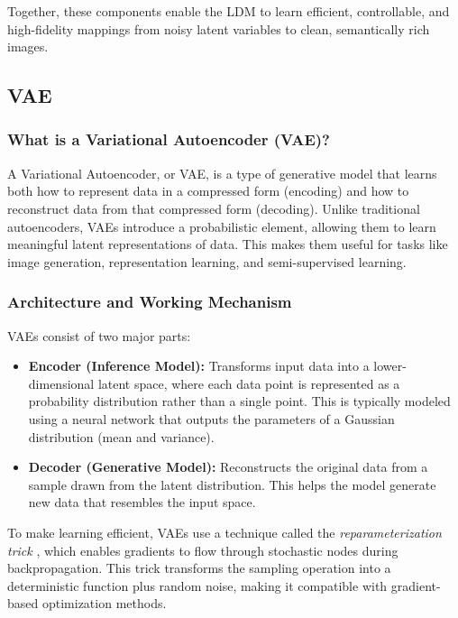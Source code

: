 Together, these components enable the LDM to learn efficient, controllable, and high-fidelity mappings from noisy latent variables to clean, semantically rich images.


\subsection{VAE}

\subsubsection{What is a Variational Autoencoder (VAE)?}
A Variational Autoencoder, or VAE, is a type of generative model that learns both how to represent data in a compressed form (encoding) and how to reconstruct data from that compressed form (decoding). Unlike traditional autoencoders, VAEs introduce a probabilistic element, allowing them to learn meaningful latent representations of data. This makes them useful for tasks like image generation, representation learning, and semi-supervised learning.

\subsubsection{Architecture and Working Mechanism}
VAEs consist of two major parts:
\begin{itemize}
    \item \textbf{Encoder (Inference Model):} Transforms input data into a lower-dimensional latent space, where each data point is represented as a probability distribution rather than a single point. This is typically modeled using a neural network that outputs the parameters of a Gaussian distribution (mean and variance).
    \item \textbf{Decoder (Generative Model):} Reconstructs the original data from a sample drawn from the latent distribution. This helps the model generate new data that resembles the input space.
\end{itemize}

To make learning efficient, VAEs use a technique called the \textit{reparameterization trick} \cite{Kingma_2019}, which enables gradients to flow through stochastic nodes during backpropagation. This trick transforms the sampling operation into a deterministic function plus random noise, making it compatible with gradient-based optimization methods.

